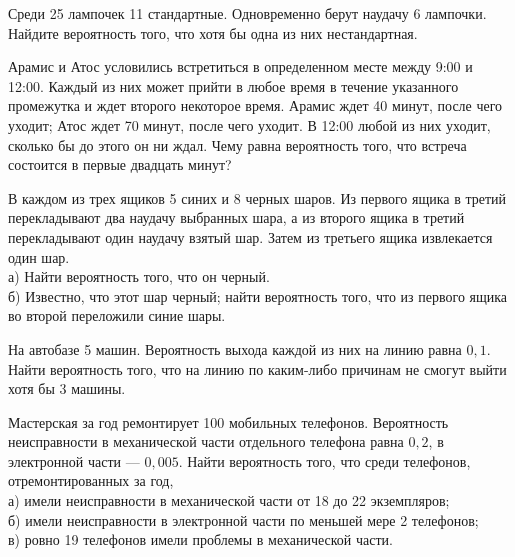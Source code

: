 \newpage\setcounter{zad}{0}



\begin{zkrW}{20}\noindent 
	Среди 25 лампочек 11 стандартные. Одновременно берут наудачу 6 лампочки. Найдите вероятность того, что хотя бы одна из них нестандартная.
 
\end{zkrW}

\begin{zkrW}{20}\noindent 
	Арамис и Атос условились встретиться в определенном месте между 9:00 и 12:00. Каждый из них может прийти в любое время в течение указанного промежутка и ждет второго некоторое время. Арамис ждет 40 минут, после чего уходит; Атос ждет 70 минут, после чего уходит. В 12:00 любой из них уходит, сколько бы до этого он ни ждал. Чему равна вероятность того, что встреча состоится в первые двадцать минут?
 
\end{zkrW}

\begin{zkrW}{20}\noindent 
	В каждом из трех ящиков 5 синих и 8 черных шаров. Из первого ящика в третий перекладывают два наудачу выбранных шара, а из второго ящика в третий перекладывают один наудачу взятый шар. Затем из третьего ящика извлекается один шар. \\ \indent а) Найти вероятность того, что он черный. \\ \indent б) Известно, что этот шар черный; найти вероятность того, что из первого ящика во второй переложили синие шары.
 
\end{zkrW}

\begin{zkrW}{20}\noindent 
	На автобазе 5 машин. Вероятность выхода каждой из них на линию равна $0{,}1$. Найти вероятность того, что на линию по каким-либо причинам не смогут выйти хотя бы 3 машины.
 
\end{zkrW}

\begin{zkrW}{20}\noindent 
	Мастерская за год ремонтирует 100 мобильных телефонов. Вероятность неисправности в механической части отдельного телефона равна $0{,}2$, в электронной части --- $0{,}005$. Найти вероятность того, что среди телефонов, отремонтированных за год, \\ \indent а) имели неисправности в механической части от 18 до 22 экземпляров; \\ \indent б) имели неисправности в электронной части по меньшей мере 2 телефонов; \\ \indent в) ровно 19 телефонов имели проблемы в механической части.
 
\end{zkrW}

